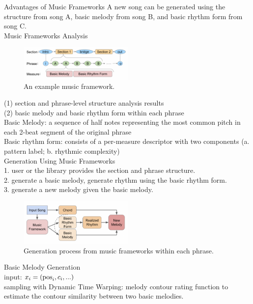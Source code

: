 \documentclass{article}
\begin{document}
\noindent
Advantages of Music Frameworks
A new song can be generated using the structure from song A, basic melody from song B, and basic rhythm form from song C.\\

\noindent
Music Frameworks Analysis
\begin{figure}[H]
	\centerline{
   \includegraphics[width=0.5\textwidth]{Fig4.png}}
   \caption{An example music framework.}
   \label{fig:example}
\end{figure}
\noindent
(1) section and phrase-level structure analysis results\\
(2) basic melody and basic rhythm form within each phrase\\
\indent
Basic Melody: a sequence of half notes representing the most common pitch in each 2-beat segment of the original phrase\\
\indent
Basic rhythm form: consists of a per-measure descriptor with two components (a. pattern label; b. rhythmic complexity)\\

\noindent
Generation Using Music Frameworks\\
1. user or the library provides the section and phrase structure.\\
2. generate a basic melody, generate rhythm using the basic rhythm form.\\
3. generate a new melody given the basic melody.\\
\begin{figure}[H]
	\centerline{
   \includegraphics[width=0.5\textwidth]{Fig5.png}}
   \caption{Generation process from music frameworks within each phrase.}
   \label{fig:example}
\end{figure}

\noindent
Basic Melody Generation\\
input: $x_i = ({\rm pos}_i, c_i, ...)$\\
sampling with Dynamic Time Warping: melody contour rating function to estimate the contour similarity between two basic melodies.\\
\end{document}
